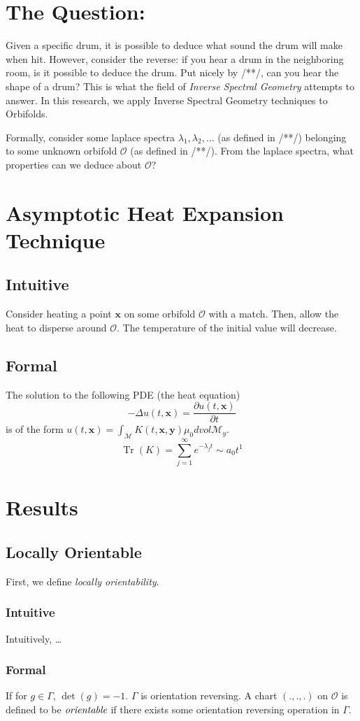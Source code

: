 \documentclass{article}
\newcommand{\pder}[2]{\frac{\partial#1}{\partial#2}}
\DeclareMathOperator{\tr}{Tr}
\begin{document}
\section{The Question:}
Given a specific drum, it is possible to deduce what sound the drum will make when hit. However, consider the reverse: if you hear a drum in the neighboring room, is it possible to deduce the drum. Put nicely by /**/, can you hear the shape of a drum? This is what the field of \emph{Inverse Spectral Geometry} attempts to answer. In this research, we apply Inverse Spectral Geometry techniques to Orbifolds.

Formally, consider some laplace spectra $\lambda_1, \lambda_2, \dots$ (as defined in /**/) belonging to some unknown orbifold $\mathcal{O}$ (as defined in /**/). From the laplace spectra, what properties can we deduce about $\mathcal{O}$?

\section{Asymptotic Heat Expansion Technique}
\subsection{Intuitive}
Consider heating a point $\mathbf{x}$ on some orbifold $\mathcal{O}$ with a
match. Then, allow the heat to disperse around $\mathcal{O}$. The
temperature of the initial value will decrease.

\subsection{Formal}
The solution to the following PDE (the heat equation)
$$-\Delta u(t,\mathbf{x}) =  \pder{u(t,\mathbf{x})}{t}$$
is of the form $u(t,\mathbf{x}) = \int_{\mathcal{M}}
K(t,\mathbf{x},\mathbf{y}) \mu_0dvol
\mathcal{M}_y$. \\
$$\tr(K) = \sum_{j=1}^{\infty}e^{-\lambda_j t} \sim a_0 t^{1}$$

\section{Results}

\subsection{Locally Orientable}
First, we define \emph{locally orientability}. 
\subsubsection{Intuitive}
Intuitively, \dots

\subsubsection{Formal}

If for $g \in \Gamma$, $\det(g) = -1$. $\Gamma$ is orientation reversing.
A chart $(.,.,.)$ on $\mathcal{O}$ is defined to be $\emph{orientable}$ if there exists
some orientation reversing operation in $\Gamma$.
\end{document}
